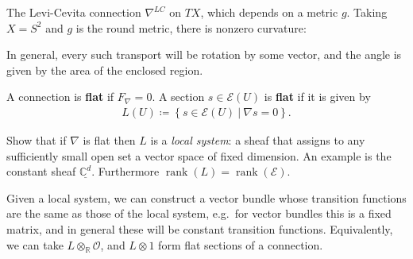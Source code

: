 \begin{example}

The Levi-Cevita connection \(\nabla^{LC}\) on \(TX\), which depends on a
metric \(g\). Taking \(X=S^2\) and \(g\) is the round metric, there is
nonzero curvature:

\begin{figure}
\centering
{}
\end{figure}

In general, every such transport will be rotation by some vector, and
the angle is given by the area of the enclosed region.

\end{example}

\begin{definition}

A connection is \textbf{flat} if \(F_\nabla = 0\). A section
\(s \in \mathcal{E}(U)\) is \textbf{flat} if it is given by
\begin{align*}
L(U) \coloneqq\left\{{ s\in \mathcal{E}(U) {~\mathrel{\Big|}~}\nabla s = 0}\right\}
.\end{align*}

\end{definition}

\begin{exercise}[?]

Show that if \(\nabla\) is flat then \(L\) is a \emph{local system}: a
sheaf that assigns to any sufficiently small open set a vector space of
fixed dimension. An example is the constant sheaf
\(\underline{{\mathbb{C}}^d}\). Furthermore
\({\operatorname{rank}}(L) = {\operatorname{rank}}(\mathcal{E})\).

\end{exercise}

\begin{remark}

Given a local system, we can construct a vector bundle whose transition
functions are the same as those of the local system, e.g.~for vector
bundles this is a fixed matrix, and in general these will be constant
transition functions. Equivalently, we can take
\(L\otimes_{\mathbb{R}}{\mathcal{O}}\), and \(L\otimes 1\) form flat
sections of a connection.

\end{remark}

